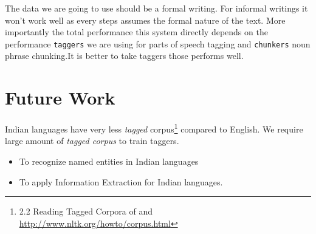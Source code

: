 \documentclass[12pt]{report}
\begin{document}
The data we are going to use should be a formal writing.
 For informal writings it won't work well as every steps assumes the formal nature
  of the text.
 More importantly the total performance this system directly depends on the performance \texttt{taggers}
  we are using
  for parts of speech tagging and \texttt{chunkers} noun phrase chunking.It is better to take taggers those
   performs well.


\section{Future Work}
\par Indian languages have very less \textit{tagged} corpus\footnote{2.2 Reading Tagged Corpora of \cite{tag} and \url{http://www.nltk.org/howto/corpus.html}} compared to English. We require
large amount of \textit{tagged corpus} to train taggers.
\begin{itemize}
\item To recognize named entities in Indian languages
\item To apply Information Extraction for Indian languages.
\end{itemize}
\end{document}
